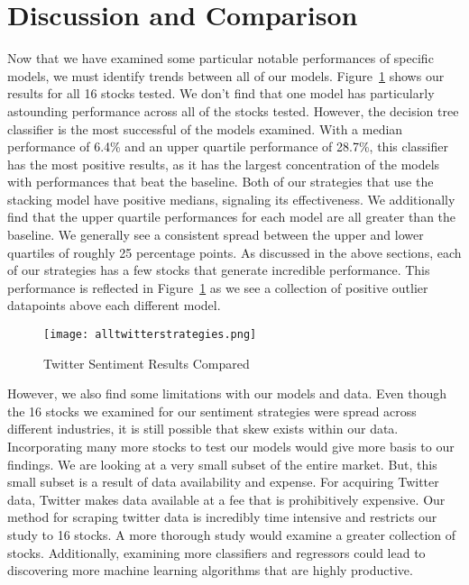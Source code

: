 \documentclass[../thesis.tex]{subfiles}
\begin{document}
\section{Discussion and Comparison}
\label{discussion}

Now that we have examined some particular notable performances of specific models, we must identify trends between all of our models. Figure~\ref{alltweetresults} shows our results for all 16 stocks tested. We don't find that one model has particularly astounding performance across all of the stocks tested. However, the decision tree classifier is the most successful of the models examined. With a median performance of 6.4\% and an upper quartile performance of 28.7\%, this classifier has the most positive results, as it has the largest concentration of the models with performances that beat the baseline. Both of our strategies that use the stacking model have positive medians, signaling its effectiveness. We additionally find that the upper quartile performances for each model are all greater than the baseline. We generally see a consistent spread between the upper and lower quartiles of roughly 25 percentage points. As discussed in the above sections, each of our strategies has a few stocks that generate incredible performance. This performance is reflected in Figure~\ref{alltweetresults} as we see a collection of positive outlier datapoints above each different model. 

\begin{figure}[h]
\centering
\texttt{[image: alltwitterstrategies.png]}
\caption{Twitter Sentiment Results Compared \label{overflow}}
\label{alltweetresults}
\end{figure}

However, we also find some limitations with our models and data. Even though the 16 stocks we examined for our sentiment strategies were spread across different industries, it is still possible that skew exists within our data. Incorporating many more stocks to test our models would give more basis to our findings. We are looking at a very small subset of the entire market. But, this small subset is a result of data availability and expense. For acquiring Twitter data, Twitter makes data available at a fee that is prohibitively expensive. Our method for scraping twitter data is incredibly time intensive and restricts our study to 16 stocks.  A more thorough study would examine a greater collection of stocks. Additionally, examining more classifiers and regressors could lead to discovering more machine learning algorithms that are highly productive. 
\end{document}
